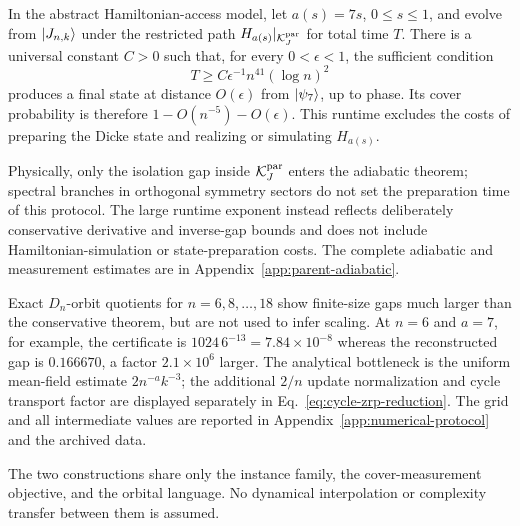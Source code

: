 \begin{corollary}
\label{cor:cycle-adiabatic-preparation}
In the abstract Hamiltonian-access model, let $a(s)=7s$, $0\leq s\leq1$,
and evolve from $\lvert J_{n,k}\rangle$ under the restricted path
$H_{a(s)}|_{\mathcal K_J^{\rm par}}$ for total time $T$.  There is a
universal constant $C>0$ such that, for every $0<\epsilon<1$, the sufficient
condition
\begin{equation}
 T\geq C\epsilon^{-1}n^{41}(\log n)^2
 \label{eq:cycle-adiabatic-runtime}
\end{equation}
produces a final state at distance $O(\epsilon)$ from
$\lvert\psi_7\rangle$, up to phase.  Its cover probability is therefore
$1-O(n^{-5})-O(\epsilon)$.  This runtime excludes the costs of preparing the
Dicke state and realizing or simulating $H_{a(s)}$.
\end{corollary}

Physically, only the isolation gap inside $\mathcal K_J^{\rm par}$ enters
the adiabatic theorem; spectral branches in orthogonal symmetry sectors do
not set the preparation time of this protocol.  The large runtime exponent
instead reflects deliberately conservative derivative and inverse-gap
bounds and does not include Hamiltonian-simulation or state-preparation
costs.  The complete adiabatic and measurement estimates are in
Appendix~\ref{app:parent-adiabatic}.

Exact $D_n$-orbit quotients for $n=6,8,\ldots,18$ show finite-size gaps much
larger than the conservative theorem, but are not used to infer scaling.  At
$n=6$ and $a=7$, for example, the certificate is
$1024\,6^{-13}=7.84\times10^{-8}$ whereas the reconstructed gap is
$0.166670$, a factor $2.1\times10^6$ larger.  The analytical bottleneck is
the uniform mean-field estimate $2n^{-a}k^{-3}$; the additional $2/n$
update normalization and cycle transport factor are displayed separately in
Eq.~\eqref{eq:cycle-zrp-reduction}.  The grid and all intermediate values are reported in
Appendix~\ref{app:numerical-protocol} and the archived data.

The two constructions share only the instance family, the cover-measurement
objective, and the orbital language.  No dynamical interpolation or
complexity transfer between them is assumed.
